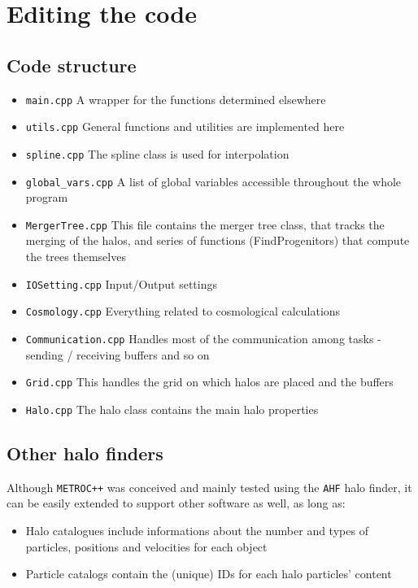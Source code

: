 \documentclass{article}
\begin{document}
\section{Editing the code}
\subsection{Code structure}

\begin{itemize}
\item{\texttt{main.cpp}} A wrapper for the functions determined elsewhere
\item{\texttt{utils.cpp}} General functions and utilities are implemented here
\item{\texttt{spline.cpp}} The spline class is used for interpolation 
\item{\texttt{global\_vars.cpp}} A list of global variables accessible throughout the whole program
\item{\texttt{MergerTree.cpp}} This file contains the merger tree class, that tracks the merging of the halos, and series of functions (FindProgenitors) that compute the trees themselves
\item{\texttt{IOSetting.cpp}} Input/Output settings
\item{\texttt{Cosmology.cpp}} Everything related to cosmological calculations
\item{\texttt{Communication.cpp}} Handles most of the communication among tasks - sending / receiving buffers and so on
\item{\texttt{Grid.cpp}} This handles the grid on which halos are placed and the buffers
\item{\texttt{Halo.cpp}} The halo class contains the main halo properties
\end{itemize}

\subsection{Other halo finders}

Although \texttt{METROC++} was conceived and mainly tested using the \texttt{AHF} halo finder, it can be easily extended to 
support other software as well, as long as:

\begin{itemize}
\item Halo catalogues include informations about the number and types of particles, positions and velocities for each object
\item Particle catalogs contain the (unique) IDs for each halo particles' content
\end{itemize}
\end{document}
